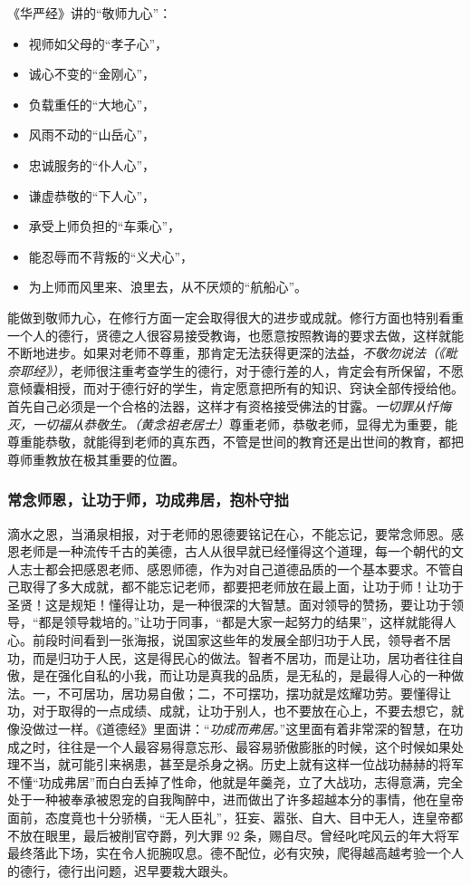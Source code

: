 《华严经》讲的“敬师九心”：\begin{multicols}{2}
    \begin{itemize}
        \item 视师如父母的“孝子心”，
        \item 诚心不变的“金刚心”，
        \item 负载重任的“大地心”，
        \item 风雨不动的“山岳心”，
        \item 忠诚服务的“仆人心”，
        \item 谦虚恭敬的“下人心”，
        \item 承受上师负担的“车乘心”，
        \item 能忍辱而不背叛的“义犬心”，
        \item 为上师而风里来、浪里去，从不厌烦的“航船心”。
    \end{itemize}
\end{multicols}

能做到敬师九心，在修行方面一定会取得很大的进步或成就。修行方面也特别看重一个人的德行，贤德之人很容易接受教诲，也愿意按照教诲的要求去做，这样就能不断地进步。如果对老师不尊重，那肯定无法获得更深的法益，\textit{不敬勿说法（《毗奈耶经》）}，老师很注重考查学生的德行，对于德行差的人，肯定会有所保留，不愿意倾囊相授，而对于德行好的学生，肯定愿意把所有的知识、窍诀全部传授给他。首先自己必须是一个合格的法器，这样才有资格接受佛法的甘露。\textit{一切罪从忏悔灭，一切福从恭敬生。（黄念祖老居士）}尊重老师，恭敬老师，显得尤为重要，能尊重能恭敬，就能得到老师的真东西，不管是世间的教育还是出世间的教育，都把尊师重教放在极其重要的位置。

\subsubsection{常念师恩，让功于师，功成弗居，抱朴守拙}

滴水之恩，当涌泉相报，对于老师的恩德要铭记在心，不能忘记，要常念师恩。感恩老师是一种流传千古的美德，古人从很早就已经懂得这个道理，每一个朝代的文人志士都会把感恩老师、感恩师德，作为对自己道德品质的一个基本要求。不管自己取得了多大成就，都不能忘记老师，都要把老师放在最上面，让功于师！让功于圣贤！这是规矩！懂得让功，是一种很深的大智慧。面对领导的赞扬，要让功于领导，“都是领导栽培的。”让功于同事，“都是大家一起努力的结果”，这样就能得人心。前段时间看到一张海报，说国家这些年的发展全部归功于人民，领导者不居功，而是归功于人民，这是得民心的做法。智者不居功，而是让功，居功者往往自傲，是在强化自私的小我，而让功是真我的品质，是无私的，是最得人心的一种做法。一，不可居功，居功易自傲；二，不可摆功，摆功就是炫耀功劳。要懂得让功，对于取得的一点成绩、成就，让功于别人，也不要放在心上，不要去想它，就像没做过一样。《道德经》里面讲：“\textit{功成而弗居。}”这里面有着非常深的智慧，在功成之时，往往是一个人最容易得意忘形、最容易骄傲膨胀的时候，这个时候如果处理不当，就可能引来祸患，甚至是杀身之祸。历史上就有这样一位战功赫赫的将军不懂“功成弗居”而白白丢掉了性命，他就是年羹尧，立了大战功，志得意满，完全处于一种被奉承被恩宠的自我陶醉中，进而做出了许多超越本分的事情，他在皇帝面前，态度竟也十分骄横，“无人臣礼”，狂妄、嚣张、自大、目中无人，连皇帝都不放在眼里，最后被削官夺爵，列大罪 92 条，赐自尽。曾经叱咤风云的年大将军最终落此下场，实在令人扼腕叹息。德不配位，必有灾殃，爬得越高越考验一个人的德行，德行出问题，迟早要栽大跟头。

